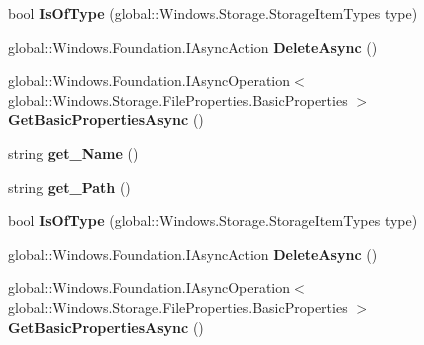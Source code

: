 \begin{DoxyCompactItemize}
\item 
\mbox{\label{interface_windows_1_1_storage_1_1_i_storage_item_a57853bba9d58c4b071bb217028afe56f}} 
bool {\bfseries Is\+Of\+Type} (global\+::\+Windows.\+Storage.\+Storage\+Item\+Types type)
\item 
\mbox{\label{interface_windows_1_1_storage_1_1_i_storage_item_a7268ae5d814924d40bb95256c8bc9e23}} 
global\+::\+Windows.\+Foundation.\+I\+Async\+Action {\bfseries Delete\+Async} ()
\item 
\mbox{\label{interface_windows_1_1_storage_1_1_i_storage_item_a83642e3d152b180ace955ef374a5aad3}} 
global\+::\+Windows.\+Foundation.\+I\+Async\+Operation$<$ global\+::\+Windows.\+Storage.\+File\+Properties.\+Basic\+Properties $>$ {\bfseries Get\+Basic\+Properties\+Async} ()
\item 
\mbox{\label{interface_windows_1_1_storage_1_1_i_storage_item_a484400e7992b97add1f16fb9c1bee73a}} 
string {\bfseries get\+\_\+\+Name} ()
\item 
\mbox{\label{interface_windows_1_1_storage_1_1_i_storage_item_ae2665e5bf45bb4d62bf1434aa468f431}} 
string {\bfseries get\+\_\+\+Path} ()
\item 
\mbox{\label{interface_windows_1_1_storage_1_1_i_storage_item_a57853bba9d58c4b071bb217028afe56f}} 
bool {\bfseries Is\+Of\+Type} (global\+::\+Windows.\+Storage.\+Storage\+Item\+Types type)
\item 
\mbox{\label{interface_windows_1_1_storage_1_1_i_storage_item_a7268ae5d814924d40bb95256c8bc9e23}} 
global\+::\+Windows.\+Foundation.\+I\+Async\+Action {\bfseries Delete\+Async} ()
\item 
\mbox{\label{interface_windows_1_1_storage_1_1_i_storage_item_a83642e3d152b180ace955ef374a5aad3}} 
global\+::\+Windows.\+Foundation.\+I\+Async\+Operation$<$ global\+::\+Windows.\+Storage.\+File\+Properties.\+Basic\+Properties $>$ {\bfseries Get\+Basic\+Properties\+Async} ()

\end{DoxyCompactItemize}
